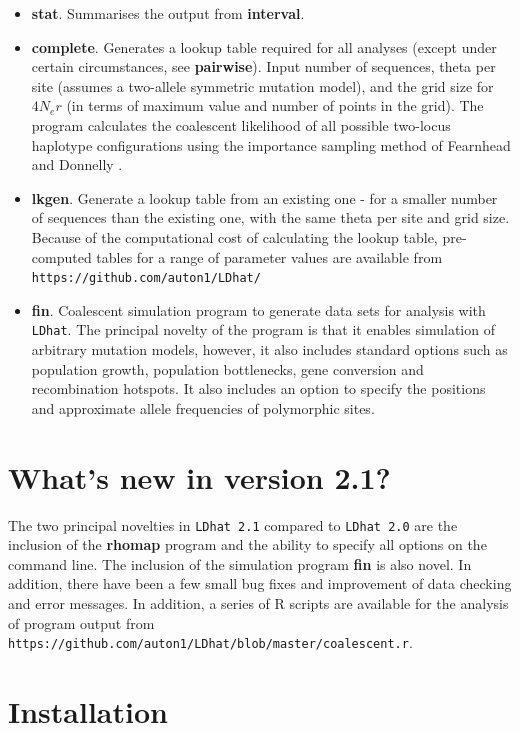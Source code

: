 \documentclass[a4paper,10pt,fullpage]{article}
\begin{document}
\begin{itemize}
\item {\bf stat}.  Summarises the output from {\bf interval}. 

\item {\bf complete}.  Generates a lookup table required for all
analyses (except under certain circumstances, see {\bf pairwise}).
Input number of sequences, theta per site (assumes a two-allele
symmetric mutation model), and the grid size for $4N_er$ (in terms
of maximum value and number of points in the grid).  The program
calculates the coalescent likelihood of all possible two-locus
haplotype configurations using the importance sampling method of
Fearnhead and Donnelly \cite{FearnheadDonnelly01}.

\item {\bf lkgen}. Generate a lookup table from an existing one -
for a smaller number of sequences than the existing one, with the
same theta per site and grid size. Because of the computational
cost of calculating the lookup table, pre-computed tables for a
range of parameter values are available from
\verb+https://github.com/auton1/LDhat/+

\item {\bf fin}.  Coalescent simulation program to generate data sets for analysis with \verb+LDhat+.  The principal novelty of the program is that it enables simulation of arbitrary mutation models, however, it also includes standard options such as population growth, population bottlenecks, gene conversion and recombination hotspots.  It also includes an option to specify the positions and approximate allele frequencies of polymorphic sites.

\end{itemize}

\section{What's new in version 2.1?}

The two principal novelties in \verb+LDhat 2.1+ compared to \verb+LDhat 2.0+ are the inclusion of the {\bf rhomap} program \cite{AutonMcVean07} and the ability to specify all options on the command line.  The inclusion of the simulation program {\bf fin} is also novel.  In addition, there have been a few small bug fixes and improvement of data checking and error messages.  In addition, a series of R scripts are available for the analysis of program output from \verb+https://github.com/auton1/LDhat/blob/master/coalescent.r+.


\section{Installation}
\end{document}
